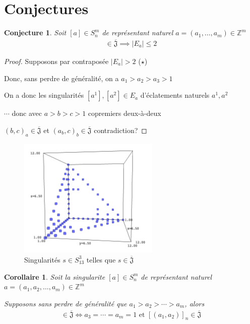 \documentclass{article}
\newtheorem{conjecture}{Conjecture}
\newtheorem{corollary}{Corollaire}
\newcommand{\J}{\mathfrak{J}}
\newcommand{\JS}{\overline{\J}}
\begin{document}
\newpage

\section{Conjectures}

\begin{conjecture}
    Soit $[a] \in S_n^m$ de représentant naturel $a = (a_1, \dots, a_m) \in \mathbb{Z}^m$
    \begin{align*}
        [a] \in \JS \implies |E_a| \leq 2
    \end{align*}
\end{conjecture}

\begin{proof}
    Supposons par contraposée $|E_a| > 2$ ($\star$)

    Donc, sans perdre de généralité, on a $a_1 > a_2 > a_3 > 1$

    On a donc les singularités $[a^1], [a^2] \in E_a$ d'éclatements naturels $a^1, a^2$

    $\cdots$ donc avec $a > b > c > 1$ copremiers deux-à-deux

    ${(b, c)}_a \in \JS$ et ${(a_b, c)}_b \in \JS$ contradiction?
\end{proof}

\begin{figure}[h]
    \caption{Singularités $s \in S_{13}^3$ telles que $s \in \JS$}
    \centering
    \includegraphics[width=0.6\textwidth]{singularite_j_strict_m3_n13}
\end{figure}

\begin{corollary}
    Soit la singularite $[a] \in S_n^m$ de représentant naturel $a = (a_1, a_2, \dots, a_m) \in \mathbb{Z}^m$

    Supposons sans perdre de généralité que $a_1 > a_2 > \cdots > a_m$, alors
    \begin{align*}
        [a] \in \JS \iff a_3 = \cdots = a_m = 1 \text{ et } {[(a_1, a_2)]}_n \in \JS
    \end{align*}
\end{corollary}
\end{document}
